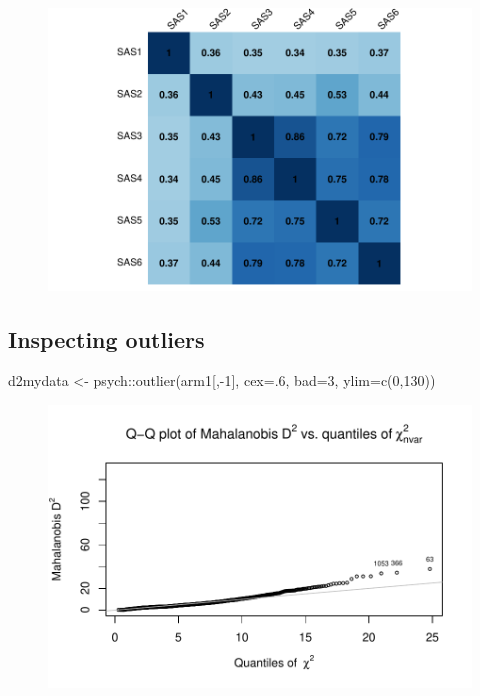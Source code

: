 \documentclass[
  letterpaper,
  DIV=11,
  numbers=noendperiod]{scrreprt}
\newenvironment{Shaded}{\begin{snugshade}}{\end{snugshade}}
\newcommand{\AttributeTok}[1]{\textcolor[rgb]{0.40,0.45,0.13}{#1}}
\newcommand{\DecValTok}[1]{\textcolor[rgb]{0.68,0.00,0.00}{#1}}
\newcommand{\FunctionTok}[1]{\textcolor[rgb]{0.28,0.35,0.67}{#1}}
\newcommand{\NormalTok}[1]{\textcolor[rgb]{0.00,0.23,0.31}{#1}}
\newcommand{\OtherTok}[1]{\textcolor[rgb]{0.00,0.23,0.31}{#1}}
\newcommand{\SpecialCharTok}[1]{\textcolor[rgb]{0.37,0.37,0.37}{#1}}
\begin{document}
\begin{figure}[H]

{\centering \includegraphics{02_data-screening_files/figure-pdf/correlation-plot-1.pdf}

}

\end{figure}

\hypertarget{inspecting-outliers}{%
\subsection{Inspecting outliers}\label{inspecting-outliers}}

\begin{Shaded}
\begin{Highlighting}[]
\NormalTok{d2mydata }\OtherTok{\textless{}{-}}\NormalTok{ psych}\SpecialCharTok{::}\FunctionTok{outlier}\NormalTok{(arm1[,}\SpecialCharTok{{-}}\DecValTok{1}\NormalTok{], }\AttributeTok{cex=}\NormalTok{.}\DecValTok{6}\NormalTok{, }\AttributeTok{bad=}\DecValTok{3}\NormalTok{, }\AttributeTok{ylim=}\FunctionTok{c}\NormalTok{(}\DecValTok{0}\NormalTok{,}\DecValTok{130}\NormalTok{))}
\end{Highlighting}
\end{Shaded}

\begin{figure}[H]

{\centering \includegraphics{02_data-screening_files/figure-pdf/mahal-dist-1.pdf}

}

\end{figure}
\end{document}

